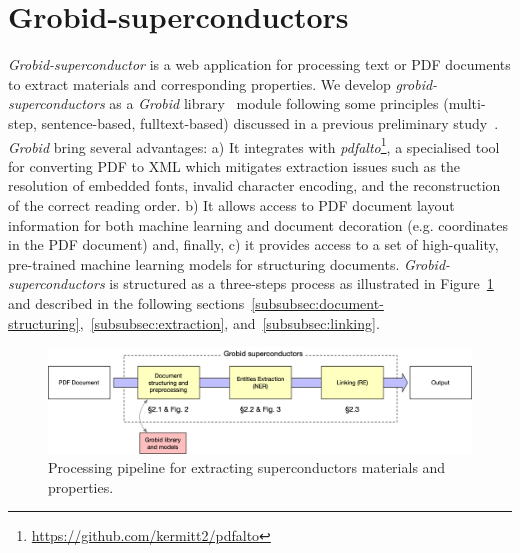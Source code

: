 \documentclass[]{interact}
\theoremstyle{plain}%
\theoremstyle{definition}
\theoremstyle{remark}
\begin{document}
\section{Grobid-superconductors}

\textit{Grobid-superconductor} is a web application for processing text or PDF documents to extract materials and corresponding properties. 
We develop \textit{grobid-superconductors} as a \textit{Grobid} library~\cite{GROBID} module following some principles (multi-step, sentence-based, fulltext-based) discussed in a previous preliminary study~\cite{foppiano:hal-02870896}.  
\textit{Grobid} bring several advantages: a) It integrates with \textit{pdfalto}\footnote{\url{https://github.com/kermitt2/pdfalto}}, a specialised tool for converting PDF to XML which mitigates extraction issues such as the resolution of embedded fonts, invalid character encoding, and the reconstruction of the correct reading order. 
b) It allows access to PDF document layout information for both machine learning and document decoration (e.g. coordinates in the PDF document) and, finally, c) it provides access to a set of high-quality, pre-trained machine learning models for structuring documents.
\textit{Grobid-superconductors} is structured as a three-steps process as illustrated in Figure~\ref{fig:pipeline-overview} and described in the following sections~\ref{subsubsec:document-structuring},~\ref{subsubsec:extraction}, and~\ref{subsubsec:linking}.

\begin{figure}[ht]
\includegraphics[width=\textwidth]{schema-architecture-colors}
\caption{Processing pipeline for extracting superconductors materials and properties. }
\label{fig:pipeline-overview}
\end{figure}
\end{document}
